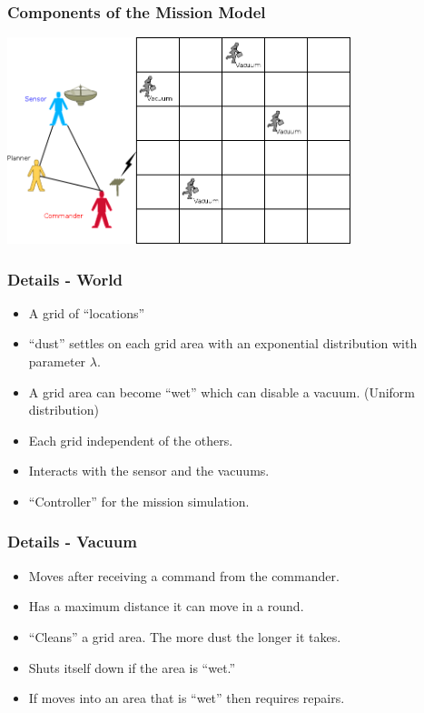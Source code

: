 \documentclass{beamer}
\begin{document}
\begin{frame}
  \frametitle{Components of the Mission Model}

  \includegraphics[height=6cm]{conceptualWorld.png}

\end{frame}



\begin{frame}
  \frametitle{Details - World}

  \begin{itemize}
  \item A grid of ``locations''
  \item ``dust'' settles on each grid area with an exponential distribution
    with parameter $\lambda$.
  \item A grid area can become ``wet'' which can disable a
    vacuum. (Uniform distribution)
  \item Each grid independent of the others.
  \item Interacts with the sensor and the vacuums.
  \item ``Controller'' for the mission simulation.
  \end{itemize}
  
\end{frame}


\begin{frame}
  \frametitle{Details - Vacuum}

  \begin{itemize}
  \item Moves after receiving a command from the commander.
  \item Has a maximum distance it can move in a round.
  \item ``Cleans'' a grid area. The more dust the longer it takes.
  \item Shuts itself down if the area is ``wet.''
  \item If moves into an area that is ``wet'' then requires repairs.
  \end{itemize}
  
\end{frame}
\end{document}
